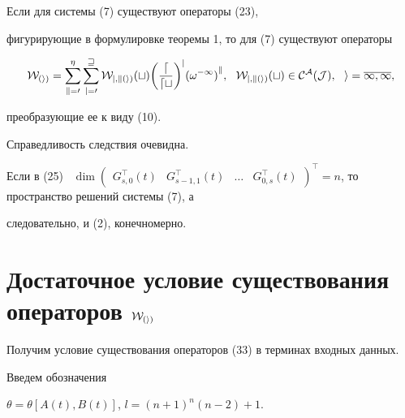\begin{cor}


Если для системы (7) существуют операторы (23),


фигурирующие в формулировке теоремы 1, то для (7) существуют операторы


\begin{equation}


\cal W_{(i)}=\sum_{k=0}^{\eta}{


\sum_{j=0}^{w}


{W_{j,k(i)}(t) \bigg( \frac{d}{dt}\bigg)^j


{(\omega^{-1})}^k}}, \ \ W_{j,k(i)}(t) \in \cal C^A(J), \ \


i=\overline{1,\infty},


\end{equation}


преобразующие ее к виду (10).


\end{cor}





Справедливость следствия очевидна.





\begin{note}


Если в (25) \ $\dim \begin{pmatrix}


G_{s,0}^\top(t) & G_{s-1,1}^\top(t) & \dotsc & G_{0,s}^\top (t) 


\end{pmatrix}^\top=n$, то пространство решений системы (7), а


следовательно, и (2), конечномерно.


\end{note}





\section{Достаточное условие существования операторов $\cal W_{(i)}$}





Получим условие существования операторов (33) в терминах входных данных.


Введем обозначения


$\theta =\theta [A(t),B(t)]$, $l=(n+1)^n(n-2)+1$.





